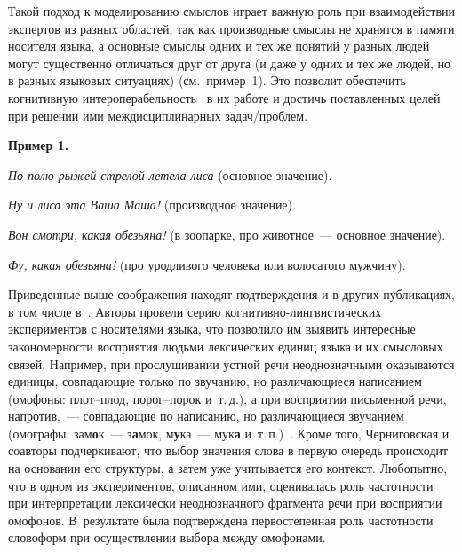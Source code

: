 \begin{multicols}{2}
Такой 
подход к моделированию смыслов играет важную роль при взаимодействии 
экспертов из разных областей, так как производные смыслы не хранятся в 
памяти носителя языка, а основные смыс\-лы одних и тех же понятий у разных 
людей могут существенно отличаться друг от друга (и даже у одних и тех же 
людей, но в разных языковых ситуациях) (см.\ пример~1). Это позволит 
обеспечить когнитивную интероперабельность~\cite{29-ko} в их работе и 
достичь поставленных целей при решении ими междисциплинарных 
     за\-дач/проб\-лем.

\medskip

\noindent
\textbf{Пример 1.}

{\small
\textit{По полю рыжей стрелой летела лиса} (основное значение).

\textit{Ну и лиса эта Ваша Маша!} (производное значение).

\textit{Вон смотри, какая обезьяна!} (в зоопарке, про животное~--- основное значение).

\textit{Фу, какая обезьяна!} (про уродливого человека или волосатого мужчину).
}

\medskip

     Приведенные выше соображения находят подтверждения и в других 
публикациях, в том числе в~\cite{30-ko}. Авторы провели серию 
     ког\-ни\-тив\-но-линг\-ви\-сти\-че\-ских экспериментов с носителями 
языка, что позволило им выявить интересные закономерности восприятия 
людьми лексических единиц языка и их смысловых связей. Например, при 
прослушивании устной речи неоднозначными оказываются единицы, 
совпадающие только по звучанию, но различающиеся написанием (омофоны: 
плот--плод, по\-рог--по\-рок и~т.\,д.), а при восприятии письменной речи, 
напротив,~--- совпадающие по написанию, но различающиеся звучанием 
(омографы: зам\textbf{о}к~--- з\textbf{а}мок, м\textbf{у}ка~--- мук\textbf{а} 
и~т.\,п.)~\cite{30-ko}. Кроме того, Черниговская и соавторы подчеркивают, 
что выбор значения слова в первую очередь происходит на основании его 
структуры, а затем уже учитывается его контекст. Любопытно, что в одном 
из экспериментов, описанном ими, оценивалась роль частотности при 
интерпретации лексически неоднозначного фрагмента речи при восприятии 
омофонов. В~результате была подтверждена первостепенная роль 
частотности словоформ при осуществлении выбора между омофонами.

\begin{figure*}[b] %
 \begin{center}
 \mbox{%
 \epsfxsize=109.851mm
 }
 \end{center}
 \vspace*{-6pt}
\end{figure*}
     

\end{multicols}
